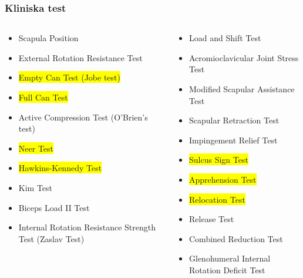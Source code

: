 \documentclass[aspectratio=169,12pt,handout,usenames,dvipsnames]{beamer}
\begin{document}
\begin{frame}
	\frametitle{Kliniska test}
	\begin{columns}
		\begin{column}{0.5\textwidth}
			\begin{itemize}
				\item Scapula Position
				\item External Rotation Resistance Test
				\item \colorbox{yellow}{Empty Can Test (Jobe test)}
				\item \colorbox{yellow}{Full Can Test}
				\item Active Compression Test (O’Brien’s test)
				\item \colorbox{yellow}{Neer Test}
				\item \colorbox{yellow}{Hawkins-Kennedy Test}
				\item Kim Test
				\item Biceps Load II Test
				\item Internal Rotation Resistance Strength Test (Zaslav Test)
			\end{itemize}
		\end{column}
		\begin{column}{0.5\textwidth}
			\begin{itemize}
				\item Load and Shift Test
				\item Acromioclavicular Joint Stress Test
				\item Modified Scapular Assistance Test
				\item Scapular Retraction Test
				\item Impingement Relief Test
				\item \colorbox{yellow}{Sulcus Sign Test}
				\item \colorbox{yellow}{Apprehension Test}
				\item \colorbox{yellow}{Relocation Test}
				\item Release Test
				\item Combined Reduction Test
				\item Glenohumeral Internal Rotation Deficit Test
			\end{itemize}
		\end{column}
	\end{columns}
\end{frame}
\end{document}
